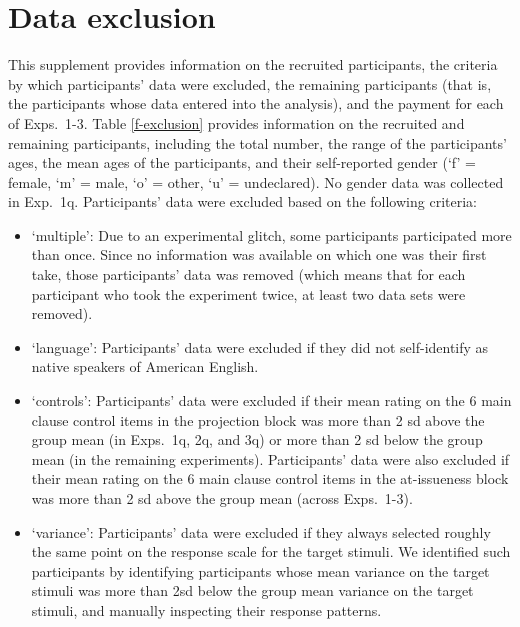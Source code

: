 \documentclass[11pt,fleqn]{article}
\newcommand{\6}{\mbox{$[\hspace*{-.6mm}[$}}
\newcommand{\9}{\mbox{$]\hspace*{-.6mm}]$}}
\begin{document}
\section{Data exclusion}\label{a-participants}

This supplement provides information on the recruited participants, the criteria by which participants' data were excluded, the remaining participants (that is, the participants whose data entered into the analysis), and the payment for each of Exps.~1-3. Table \ref{f-exclusion} provides information on the recruited and remaining participants, including the total number, the range of the participants' ages, the mean ages of the participants, and their self-reported gender (`f' = female, `m' = male, `o' = other, `u' = undeclared). No gender data was collected in Exp.~1q. Participants' data were excluded based on the following criteria:

\begin{itemize}[itemsep=-2pt]

\item `multiple': Due to an experimental glitch, some participants participated more than once. Since no information was available on which one was their first take, those participants' data was removed (which means that for each participant who took the experiment twice, at least two data sets were removed).

\item `language': Participants' data were excluded if they did not self-identify as native speakers of American English.

\item `controls': Participants' data were excluded if their mean rating on the 6 main clause control items in the projection block was more than 2 sd above the group mean (in Exps.~1q, 2q, and 3q) or more than 2 sd below the group mean (in the remaining experiments). Participants' data were also excluded if their mean rating on the 6 main clause control items in the at-issueness block was more than 2 sd above the group mean (across Exps.~1-3).
 
\item `variance': Participants' data were excluded if they always selected roughly the same point on the response scale for the target stimuli. We identified such participants by identifying participants whose mean variance on the target stimuli was more than 2sd below the group mean variance on the target stimuli, and manually inspecting their response patterns. %
\end{itemize}
\end{document}

